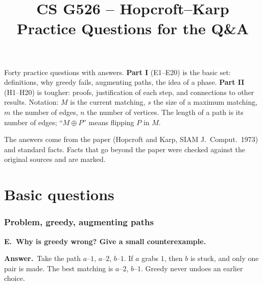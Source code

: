 \documentclass[11pt]{article}
\title{CS G526 -- Hopcroft--Karp\\Practice Questions for the Q\&A}
\author{}
\date{}
\newcounter{qe}\newcounter{qh}
\newcommand{\Qhead}[2]{%
  \vspace{0.9em}\par\noindent
  {\large\bfseries #1\ #2}\par\nopagebreak\vspace{-0.2em}}
\newcommand{\EQ}[1]{\refstepcounter{qe}\Qhead{E\theqe.}{#1}}
\newcommand{\A}{\par\noindent\textbf{Answer.}\ }
\newcommand{\symd}{\oplus}
\begin{document}
\maketitle

\noindent Forty practice questions with answers. \textbf{Part I} (E1--E20) is the
basic set: definitions, why greedy fails, augmenting paths, the idea of a phase.
\textbf{Part II} (H1--H20) is tougher: proofs, justification of each step, and
connections to other results. Notation: $M$ is the current matching, $s$ the size
of a maximum matching, $m$ the number of edges, $n$ the number of vertices. The
length of a path is its number of edges; ``$M\symd P$'' means flipping $P$ in $M$.

The answers come from the paper (Hopcroft and Karp, SIAM J.\ Comput.\ 1973) and
standard facts. Facts that go beyond the paper were checked against the original
sources and are marked.

\tableofcontents
\newpage

\part{Basic questions}

\section{Problem, greedy, augmenting paths}

\EQ{Why is greedy wrong? Give a small counterexample.}
\A Take the path $a$--$1$, $a$--$2$, $b$--$1$. If $a$ grabs $1$, then $b$ is stuck, and
only one pair is made. The best matching is $a$--$2$, $b$--$1$. Greedy never undoes an
earlier choice.

\begin{center}
\end{center}
\end{document}
